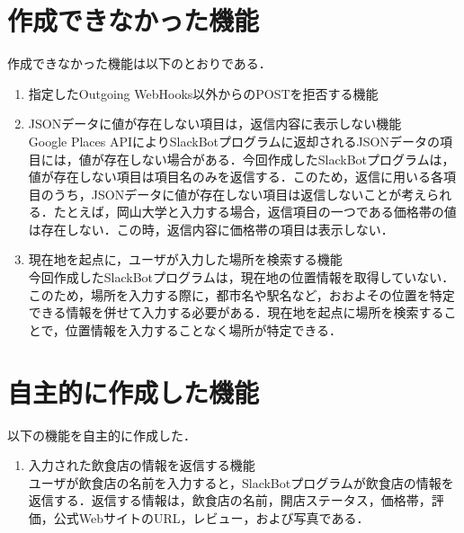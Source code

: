 \documentclass[12pt]{jsarticle}
\begin{document}
\section{作成できなかった機能}
作成できなかった機能は以下のとおりである．

\begin{enumerate}
\item 指定したOutgoing WebHooks以外からのPOSTを拒否する機能
\item JSONデータに値が存在しない項目は，返信内容に表示しない機能 \\
  Google Places APIによりSlackBotプログラムに返却されるJSONデータの項目には，値が存在しない場合がある．今回作成したSlackBotプログラムは，値が存在しない項目は項目名のみを返信する．このため，返信に用いる各項目のうち，JSONデータに値が存在しない項目は返信しないことが考えられる．たとえば，岡山大学と入力する場合，返信項目の一つである価格帯の値は存在しない．この時，返信内容に価格帯の項目は表示しない．
  
\item 現在地を起点に，ユーザが入力した場所を検索する機能\\
  今回作成したSlackBotプログラムは，現在地の位置情報を取得していない．このため，場所を入力する際に，都市名や駅名など，おおよその位置を特定できる情報を併せて入力する必要がある．現在地を起点に場所を検索することで，位置情報を入力することなく場所が特定できる．
\end{enumerate}

\section{自主的に作成した機能}
以下の機能を自主的に作成した．
\begin{enumerate}
\item 入力された飲食店の情報を返信する機能\\
  ユーザが飲食店の名前を入力すると，SlackBotプログラムが飲食店の情報を返信する．返信する情報は，飲食店の名前，開店ステータス，価格帯，評価，公式WebサイトのURL，レビュー，および写真である．
\end{enumerate}



\end{document}
